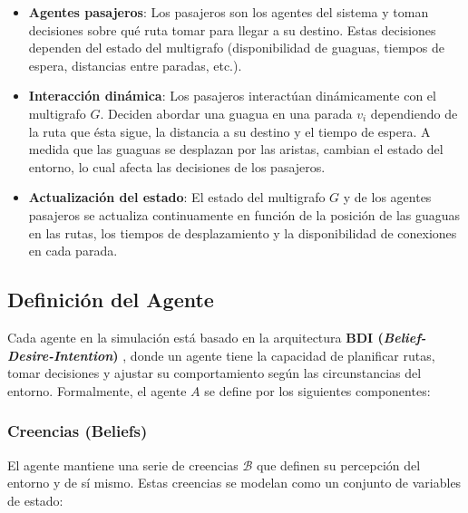 \documentclass[a4paper,12pt]{article}
\begin{document}
\begin{itemize}
    \item \textbf{Agentes pasajeros}: Los pasajeros son los agentes del sistema y toman decisiones sobre qué ruta tomar para llegar a su destino. Estas decisiones dependen del estado del multigrafo (disponibilidad de guaguas, tiempos de espera, distancias entre paradas, etc.).

    \item \textbf{Interacción dinámica}: Los pasajeros interactúan dinámicamente con el multigrafo $G$. Deciden abordar una guagua en una parada $v_i$ dependiendo de la ruta que ésta sigue, la distancia a su destino y el tiempo de espera. A medida que las guaguas se desplazan por las aristas, cambian el estado del entorno, lo cual afecta las decisiones de los pasajeros.
    
    \item \textbf{Actualización del estado}: El estado del multigrafo $G$ y de los agentes pasajeros se actualiza continuamente en función de la posición de las guaguas en las rutas, los tiempos de desplazamiento y la disponibilidad de conexiones en cada parada.
\end{itemize}


\subsection{Definición del Agente}
\label{sec:defagente}

Cada agente en la simulación está basado en la arquitectura \textbf{BDI (\textit{Belief-Desire-Intention})} \cite{rao1995bdi}, donde un agente tiene la capacidad de planificar rutas, tomar decisiones y ajustar su comportamiento según las circunstancias del entorno. Formalmente, el agente $A$ se define por los siguientes componentes:

\subsubsection{Creencias (Beliefs)}

El agente mantiene una serie de creencias $\mathcal{B}$ que definen su percepción del entorno y de sí mismo. Estas creencias se modelan como un conjunto de variables de estado:
\end{document}
